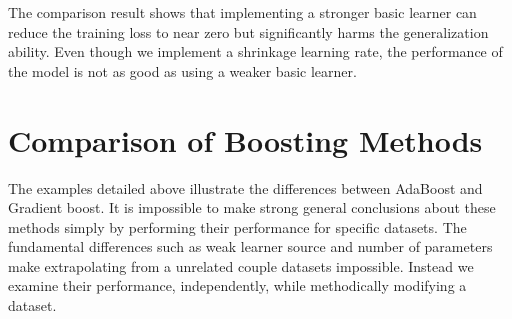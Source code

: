 \documentclass[10pt,twocolumn,letterpaper]{article}
\begin{document}
The comparison result shows that implementing a stronger basic learner can reduce the training loss to near zero but significantly harms the generalization ability. Even though we implement a shrinkage learning rate, the performance of the model is not as good as using a weaker basic learner.\\

\section{Comparison of Boosting Methods}
The examples detailed above illustrate the differences between AdaBoost and Gradient boost.  It is impossible to make strong general conclusions about these methods simply by performing their performance for specific datasets. The fundamental differences such as weak learner source and number of parameters make extrapolating from a unrelated couple datasets impossible. Instead we examine their performance, independently, while methodically modifying a dataset.     
\end{document}
